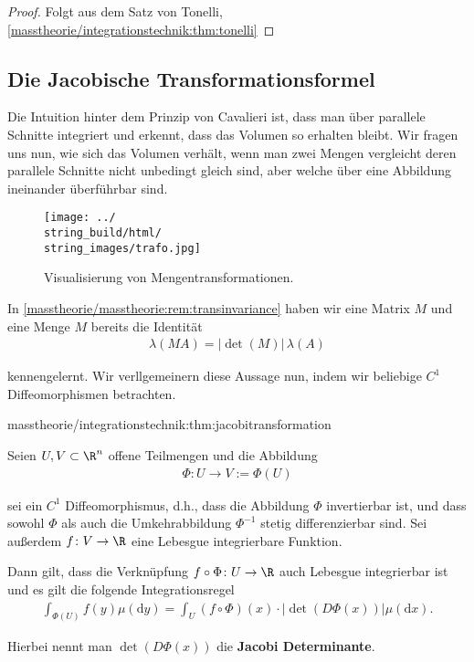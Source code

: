 \documentclass[letterpaper,10pt,german]{jupyterBook}
\begin{document}
\begin{proof}
 Folgt aus dem Satz von Tonelli, \cref{masstheorie/integrationstechnik:thm:tonelli} 
\end{proof}


\subsection{Die Jacobische Transformationsformel}
\label{\detokenize{masstheorie/integrationstechnik:die-jacobische-transformationsformel}}
\par
Die Intuition hinter dem Prinzip von Cavalieri ist, dass man über parallele Schnitte integriert und erkennt, dass das Volumen so erhalten bleibt. Wir fragen uns nun, wie sich das Volumen verhält, wenn man zwei Mengen vergleicht deren parallele Schnitte nicht unbedingt gleich sind, aber welche über eine Abbildung ineinander überführbar sind.

\begin{figure}[htbp]
\centering


\noindent\texttt{[image: ../\\string\_build/html/\\string\_images/trafo.jpg]}
\caption{Visualisierung von Mengentransformationen.}\label{\detokenize{masstheorie/integrationstechnik:fig-trafo}}\end{figure}

\par
In \cref{masstheorie/masstheorie:rem:transinvariance} haben wir eine Matrix \(M\) und eine Menge \(M\) bereits die Identität
\begin{align*}
\lambda(MA) = |\det(M)| \, \lambda(A)
\end{align*}
\par
kennengelernt. Wir verllgemeinern diese Aussage nun, indem wir beliebige \(C^1\) Diffeomorphismen betrachten.
\begin{theorem}{}{masstheorie/integrationstechnik:thm:jacobitransformation}



\par
Seien \(U, V \subset \R^n\) offene Teilmengen und die Abbildung
\begin{align*}
\Phi \colon U \rightarrow V := \Phi(U)
\end{align*}
\par
sei ein \(C^1\) Diffeomorphismus, d.h., dass die Abbildung \(\Phi\) invertierbar ist, und dass sowohl \(\Phi\) als auch die Umkehrabbildung \(\Phi^{-1}\) stetig differenzierbar sind.
Sei außerdem \(f \colon V \rightarrow \R\) eine Lebesgue integrierbare Funktion.

\par
Dann gilt, dass die Verknüpfung \(f \circ \Phi \colon U \rightarrow \R\) auch Lebesgue integrierbar ist und es gilt die folgende Integrationsregel
\begin{align*}
\int_{\Phi(U)} f(y) \mu(\mathrm{d}y) = \int_U (f \circ \Phi)(x) \cdot |\det(D\Phi(x))|\mu(\mathrm{d}x).\end{align*}
\par
Hierbei nennt man \(\det(D\Phi(x))\) die \textbf{Jacobi Determinante}.
\end{theorem}
\end{document}
